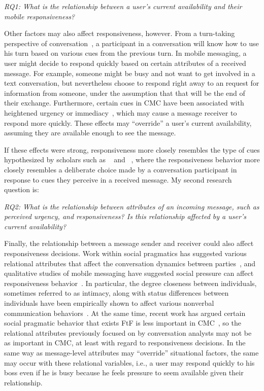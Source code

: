 \documentclass[12pt]{nuthesis}	%
\begin{document}
\textit{RQ1: What is the relationship between a user's current availability and their mobile responsiveness?}

Other factors may also affect responsiveness, however. From a turn-taking perspective of conversation~\citep{sacks1974simplest}, a participant in a conversation will know how to use his turn based on various cues from the previous turn. In mobile messaging, a user might decide to respond quickly based on certain attributes of a received message. For example, someone might be busy and not want to get involved in a text conversation, but nevertheless choose to respond right away to an request for information from someone, under the assumption that that will be the end of their exchange. Furthermore, certain cues in CMC have been associated with heightened urgency or immediacy~\citep{nguyen2014lexical}, which may cause a message receiver to respond more quickly. These effects may ``override'' a user's current availability, assuming they are available enough to see the message.

If these effects were strong, responsiveness more closely resembles the type of cues hypothesized by scholars such as ~\citet{walther1995nonverbal} and ~\citet{kalman2006pauses}, where the responsiveness behavior more closely resembles a deliberate choice made by a conversation participant in response to cues they perceive in a received message. My second research question is:

\textit{RQ2: What is the relationship between attributes of an incoming message, such as perceived urgency, and responsiveness? Is this relationship affected by a user's current availability?}

Finally, the relationship between a message sender and receiver could also affect responsiveness decisions. Work within social pragmatics has suggested various relational attributes that affect the conversation dynamics between parties~\citep{brown1987politeness,goldberg1990interrupting,west1979against,wolfson1990bulge}, and qualitative studies of mobile messaging have suggested social pressure can affect responsiveness behavior~\citep{church2013s}. In particular, the degree closeness between individuals, sometimes referred to as intimacy, along with status differences between individuals have been empirically shown to affect various nonverbal communication behaviors~\citep{guerrero1991waxing,henley1973power,leffler1982effects,sternglanz2004reading}.  At the same time, recent work has argued certain social pragmatic behavior that exists FtF is less important in CMC~\citep{schulze2017knowledge,stromer2015context}, so the relational attributes previously focused on by conversation analysts may not be as important in CMC, at least with regard to responsiveness decisions. In the same way as message-level attributes may ``override'' situational factors, the same may occur with these relational variables, i.e., a user may respond quickly to his boss even if he is busy because he feels pressure to seem available given their relationship.
\end{document}
